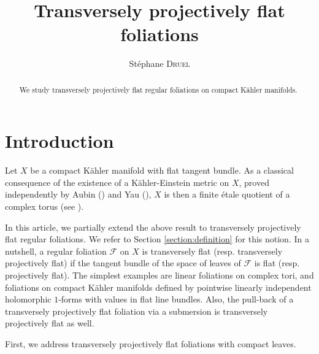 \documentclass[english,10pt]{amsart}
\newcommand{\cF}{\mathcal{F}}
\theoremstyle{definition}
\theoremstyle{remark}
\numberwithin{equation}{section}
\begin{document}
 

\title[Transversely projectively flat foliations]{Transversely projectively flat foliations}

\author{St\'ephane \textsc{Druel}}

\address{St\'ephane Druel: CNRS, Université Claude Bernard Lyon 1, UMR 5208, Institut Camille Jordan, F-69622 Villeurbanne, France} 



\begin{abstract}
We study transversely projectively flat regular foliations on compact Kähler manifolds.
\end{abstract}

\maketitle

{\small\tableofcontents}

\section{Introduction}
Let $X$ be a compact Kähler manifold with flat tangent bundle. As a classical consequence of the existence of a 
K\"ahler-Einstein metric on $X$, proved independently by Aubin (\cite{aubin_KE}) and Yau (\cite{Yau_KE}), $X$ is then a finite \'etale quotient of a complex torus (see \cite[Chapter IV Corollary 4.15]{kobayashi_diff_geom_vb}). 

\medskip

In this article, we partially extend the above result to transversely projectively flat regular foliations. We refer to Section \ref{section:definition} for this notion. In a nutshell, a regular foliation $\cF$ on $X$ is transversely flat (resp. transversely projectively flat) if the tangent bundle of the space of leaves of $\cF$ is 
flat (resp. projectively flat). The simplest examples 	are linear foliations on complex tori, and foliations
on compact Kähler manifolds defined by pointwise linearly independent holomorphic $1$-forms with values in flat line bundles. Also, the pull-back of a transversely projectively flat foliation  via a submersion is transversely projectively flat as well.

\medskip

First, we address transversely projectively flat foliations with compact leaves.
\end{document}
